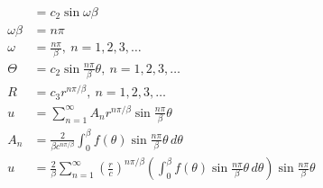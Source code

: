 \documentclass{article}
\begin{document}
\begin{align*}
                            & = c_2 \sin \omega \beta                                                                                                                                                                           \\
  \omega \beta              & = n \pi                                                                                                                                                                                           \\
  \omega                    & = \frac{n \pi}{\beta},\ n = 1, 2, 3, \ldots                                                                                                                                                       \\
  \Theta                    & = c_2 \sin \frac{n \pi}{\beta} \theta,\ n = 1, 2, 3, \ldots                                                                                                                                       \\
  R                         & = c_3 r^{n \pi / \beta},\ n = 1, 2, 3, \ldots                                                                                                                                                     \\
  u                         & = \sum_{n = 1}^\infty A_n r^{n \pi / \beta} \sin \frac{n \pi}{\beta} \theta                                                                                                                       \\
  A_n                       & = \frac{2}{\beta c^{n \pi / \beta}} \int_0^\beta f(\theta) \sin \frac{n \pi}{\beta} \theta \,d \theta                                                                                             \\
  u                         & = \frac{2}{\beta} \sum_{n = 1}^\infty \left( \frac{r}{c} \right)^{n \pi / \beta} \left( \int_0^\beta f(\theta) \sin \frac{n \pi}{\beta} \theta \,d \theta \right) \sin \frac{n \pi}{\beta} \theta
\end{align*}

\setcounter{subsubsection}{10}
\subsubsection{}
\end{document}
